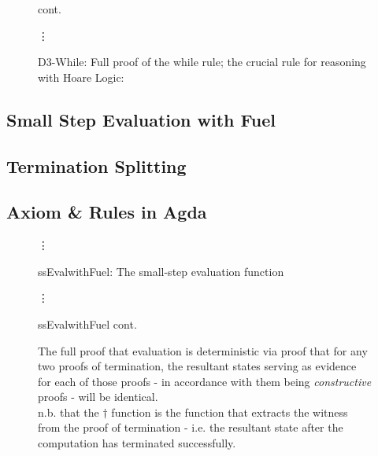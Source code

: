 \documentclass[oneside,12pt]{article}
\begin{document}
\begin{figure}\ContinuedFloat
  \caption{D3-While: Full proof of the while rule; the crucial rule for reasoning with Hoare Logic:}
  \vspace{-0.8cm}
  \begin{center}\!\!\!\small{cont.}\end{center}
  {\centering \hfill \Huge{\vdots} \hfill }
   \centering
   \small
   
\end{figure}


\lipsum[66-69]


\subsection{Small Step Evaluation with Fuel}


\lipsum[66-69]


\subsection{Termination Splitting}


\lipsum[66-75]


\subsection{Axiom \& Rules in Agda}


\begin{figure}
  \caption{ssEvalwithFuel: The small-step evaluation function}
  \centering
  
  {\centering \hfill \Huge{\vdots} \hfill }
\end{figure}

\begin{figure}\ContinuedFloat
  \caption{ssEvalwithFuel cont.}
  \centering
  { \hfill \Huge{\vdots} \hfill }
  
\end{figure}

\begin{figure}
  \caption{The full proof that evaluation is deterministic via proof that for any two proofs of termination, the resultant states serving as evidence for each of those proofs - in accordance with them being \emph{constructive} proofs - will be identical.  \\ n.b. that the $\dagger$ function is the function that extracts the witness from the proof of termination - i.e. the resultant state after the computation has terminated successfully.}
  \centering
  \scriptsize
  
\end{figure}
\end{document}
